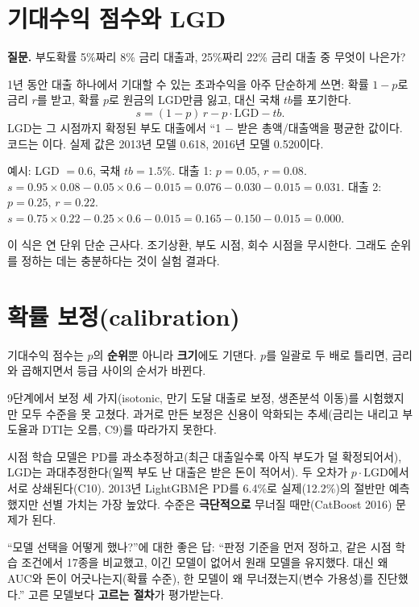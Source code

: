 \section{기대수익 점수와 LGD}
\textbf{질문.} 부도확률 5\%짜리 8\% 금리 대출과, 25\%짜리 22\% 금리 대출 중 무엇이 나은가?

1년 동안 대출 하나에서 기대할 수 있는 초과수익을 아주 단순하게 쓰면: 확률 $1-p$로 금리 $r$를 받고, 확률 $p$로 원금의 LGD만큼 잃고, 대신 국채 $tb$를 포기한다.
\[
s=(1-p)\,r-p\cdot\mathrm{LGD}-tb .
\]
LGD는 그 시점까지 확정된 부도 대출에서 ``1 $-$ 받은 총액/대출액을 평균한 값이다. 코드는 이다. 실제 값은 2013년 모델 0.618, 2016년 모델 0.520이다.

\begin{workout}
 예시: LGD $=0.6$, 국채 $tb=1.5\%$.
 대출 1: $p=0.05$, $r=0.08$. $s=0.95\times0.08-0.05\times0.6-0.015=0.076-0.030-0.015=0.031$.
 대출 2: $p=0.25$, $r=0.22$. $s=0.75\times0.22-0.25\times0.6-0.015=0.165-0.150-0.015=0.000$.
\end{workout}

이 식은 연 단위 단순 근사다. 조기상환, 부도 시점, 회수 시점을 무시한다. 그래도 순위를 정하는 데는 충분하다는 것이 실험 결과다.

\section{확률 보정(calibration)}
기대수익 점수는 $p$의 \textbf{순위}뿐 아니라 \textbf{크기}에도 기댄다. $p$를 일괄로 두 배로 틀리면, 금리와 곱해지면서 등급 사이의 순서가 바뀐다.

9단계에서 보정 세 가지(isotonic, 만기 도달 대출로 보정, 생존분석 이동)를 시험했지만 모두 수준을 못 고쳤다. 과거로 만든 보정은 신용이 악화되는 추세(금리는 내리고 부도율과 DTI는 오름, C9)를 따라가지 못한다.

\begin{whybox}
시점 학습 모델은 PD를 과소추정하고(최근 대출일수록 아직 부도가 덜 확정되어서), LGD는 과대추정한다(일찍 부도 난 대출은 받은 돈이 적어서). 두 오차가 $p\cdot\mathrm{LGD}$에서 서로 상쇄된다(C10). 2013년 LightGBM은 PD를 6.4\%로 실제(12.2\%)의 절반만 예측했지만 선별 가치는 가장 높았다. 수준은 \textbf{극단적으로} 무너질 때만(CatBoost 2016) 문제가 된다.
\end{whybox}

\begin{career}
``모델 선택을 어떻게 했나?''에 대한 좋은 답: ``판정 기준을 먼저 정하고, 같은 시점 학습 조건에서 17종을 비교했고, 이긴 모델이 없어서 원래 모델을 유지했다. 대신 왜 AUC와 돈이 어긋나는지(확률 수준), 한 모델이 왜 무너졌는지(변수 가용성)를 진단했다.'' 고른 모델보다 \textbf{고르는 절차}가 평가받는다.
\end{career}
